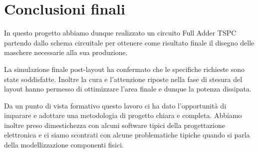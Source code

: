 
\chapter{Conclusioni finali} %
\label{Chapter5} 

In questo progetto abbiamo dunque realizzato un circuito Full Adder TSPC partendo dallo schema circuitale per ottenere come risultato finale il disegno delle maschere necessarie alla sua produzione.

La simulazione finale post-layout ha confermato che le specifiche richieste sono state soddisfatte. Inoltre la cura e l'attenzione riposte nella fase di stesura del layout hanno permesso di ottimizzare l'area finale e dunque la potenza dissipata.

Da un punto di vista formativo questo lavoro ci ha dato l'opportunità di imparare e adottare una metodologia di progetto chiara e completa. Abbiamo inoltre preso dimestichezza con alcuni software tipici della progettazione elettronica e ci siamo scontrati con alcune problematiche tipiche quando si parla della modellizzazione componenti fisici.







